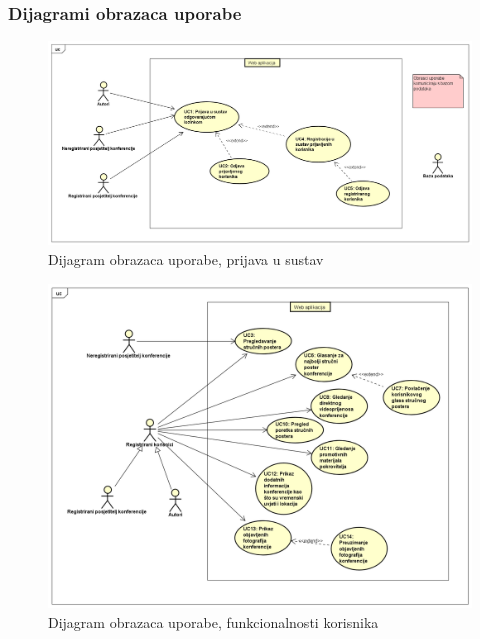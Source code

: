 					
				\subsubsection{Dijagrami obrazaca uporabe}
				
					\begin{figure}[H]
						\includegraphics[width=\textwidth]{slike/prijavaUseCase.PNG} %
						\caption{Dijagram obrazaca uporabe, prijava u sustav}
						\label{fig:prijava-dijagram} %
					\end{figure}
					
					\begin{figure}[H]
						\includegraphics[width=\textwidth]{slike/korisniciUseCase.PNG} %
						\caption{Dijagram obrazaca uporabe, funkcionalnosti korisnika}
						\label{fig:korisnik-dijagram} %
					\end{figure}
					
